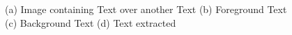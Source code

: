 \begin{figure}[hbp]
\centering
{}
\caption
{(a) Image containing Text over another Text (b) Foreground Text (c) Background Text (d)
Text extracted}
\label{fig:7}
\end{figure}


